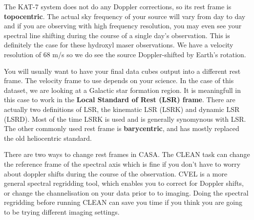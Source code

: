 \documentclass[force,almostfull,justified]{tufte-book}
\begin{document}
The KAT-7 system does not do any Doppler corrections, so its rest frame
is \textbf{topocentric}.  The actual sky frequency of your source will
vary from day to day and if you are observing with high frequency
resolution, you may even see your spectral line shifting during the
course of a single day's observation.  This is definitely the case for
these hydroxyl maser observations.  We have a velocity resolution of 68
m/s so we do see the source Doppler-shifted by Earth's rotation.

You will usually want to have your final data cubes output into a
different rest frame. The velocity frame to use depends on your science.
In the case of this dataset, we are looking at a Galactic star formation
region.  It is meaningfull in this case to work in the \textbf{Local
Standard of Rest (LSR) frame}.  There are actually two definitions of
LSR, the kinematic LSR (LSRK) and dynamic LSR (LSRD).  Most of the time
LSRK is used and is generally synomynous with LSR.  The other commonly
used rest frame is \textbf{barycentric}, and has mostly replaced the old
heliocentric standard.

There are two ways to change rest frames in CASA.  The CLEAN task can
change the reference frame of the spectral axis which is fine if you
don't have to worry about doppler shifts during the course of the
observation.  CVEL is a more general spectral regridding tool, which
enables you to correct for Doppler shifts, or change the channelisation
on your data prior to to imaging.  Doing the spectral regridding before
running CLEAN can save you time if you think you are going to be trying
different imaging settings.
\end{document}
